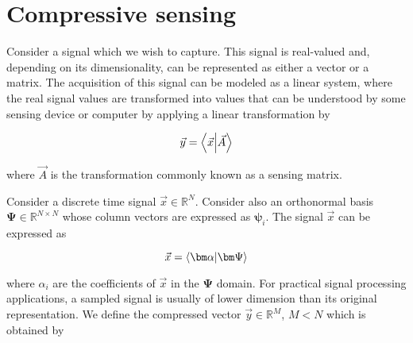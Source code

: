 \section{Compressive sensing}
\label{sec:cs}

Consider a signal which we wish to capture. This signal is real-valued and, depending on its dimensionality, can be represented as either a vector or a matrix. The acquisition of this signal can be modeled as a linear system, where the real signal values are transformed into values that can be understood by some sensing device or computer by applying a linear transformation by

\begin{equation}\label{eq:cesa}
    \vec{y} = \innerproduct{\vec{x}}{\vec{A}}
\end{equation}

\noindent where $\vec{A}$ is the transformation commonly known as a sensing matrix.

Consider a discrete time signal $\vec{x} \in \mathbb{R}^N$. Consider also an orthonormal basis $\bm\Psi \in \mathbb{R}^{N \times N}$ whose column vectors are expressed as $\bm\psi_i$. The signal $\vec{x}$ can be expressed as

\begin{equation}\label{eq:signal-transform}
	\vec{x} = \innerproduct{\bm\alpha}{\bm\Psi}
\end{equation}

\noindent where $\alpha_i$ are the coefficients of $\vec{x}$ in the $\bm\Psi$ domain. For practical signal processing applications, a sampled signal is usually of lower dimension than its original representation. We define the compressed vector $\vec{y} \in \mathbb{R}^M$, $M < N$ which is obtained by

